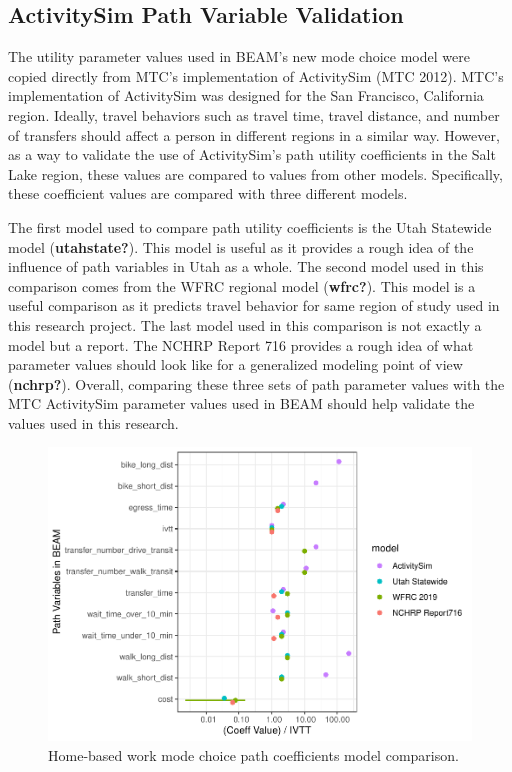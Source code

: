 \documentclass[12pt, oneside, openright]{byuthesis}
\begin{document}
\hypertarget{activitysim-path-variable-validation}{%
\subsection{ActivitySim Path Variable Validation}\label{activitysim-path-variable-validation}}

The utility parameter values used in BEAM's new mode choice model were copied directly from MTC's implementation of ActivitySim (MTC 2012). MTC's implementation of ActivitySim was designed for the San Francisco, California region. Ideally, travel behaviors such as travel time, travel distance, and number of transfers should affect a person in different regions in a similar way. However, as a way to validate the use of ActivitySim's path utility coefficients in the Salt Lake region, these values are compared to values from other models. Specifically, these coefficient values are compared with three different models.

The first model used to compare path utility coefficients is the Utah Statewide model (\textbf{utahstate?}). This model is useful as it provides a rough idea of the influence of path variables in Utah as a whole. The second model used in this comparison comes from the WFRC regional model (\textbf{wfrc?}). This model is a useful comparison as it predicts travel behavior for same region of study used in this research project. The last model used in this comparison is not exactly a model but a report. The NCHRP Report 716 provides a rough idea of what parameter values should look like for a generalized modeling point of view (\textbf{nchrp?}). Overall, comparing these three sets of path parameter values with the MTC ActivitySim parameter values used in BEAM should help validate the values used in this research.

\begin{figure}

{\centering \includegraphics{thesis_files/figure-latex/hbw-1} 

}

\caption{Home-based work mode choice path coefficients model comparison.}\label{fig:hbw}
\end{figure}
\end{document}
